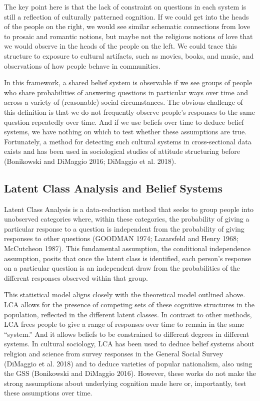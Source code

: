 \documentclass[12pt,]{article}
\begin{document}
The key point here is that the lack of constraint on questions in each system is still a reflection of culturally patterned cognition. If we could get into the heads of the people on the right, we would see similar schematic connections from love to prosaic and romantic notions, but maybe not the religious notions of love that we would observe in the heads of the people on the left. We could trace this structure to exposure to cultural artifacts, such as movies, books, and music, and observations of how people behave in communities.

In this framework, a shared belief system is observable if we see groups of people who share probabilities of answering questions in particular ways over time and across a variety of (reasonable) social circumstances. The obvious challenge of this definition is that we do not frequently observe people's responses to the same question repeatedly over time. And if we use beliefs over time to deduce belief systems, we have nothing on which to test whether these assumptions are true. Fortunately, a method for detecting such cultural systems in cross-sectional data exists and has been used in sociological studies of attitude structuring before (Bonikowski and DiMaggio 2016; DiMaggio et al. 2018).

\hypertarget{latent-class-analysis-and-belief-systems}{%
\subsection{Latent Class Analysis and Belief Systems}\label{latent-class-analysis-and-belief-systems}}

Latent Class Analysis is a data-reduction method that seeks to group people into unobserved categories where, within these categories, the probability of giving a particular response to a question is independent from the probability of giving responses to other questions (GOODMAN 1974; Lazarsfeld and Henry 1968; McCutcheon 1987). This fundamental assumption, the conditional independence assumption, posits that once the latent class is identified, each person's response on a particular question is an independent draw from the probabilities of the different responses observed within that group.

This statistical model aligns closely with the theoretical model outlined above. LCA allows for the presence of competing sets of these cognitive structures in the population, reflected in the different latent classes. In contrast to other methods, LCA frees people to give a range of responses over time to remain in the same ``system.'' And it allows beliefs to be constrained to different degrees in different systems. In cultural sociology, LCA has been used to deduce belief systems about religion and science from survey responses in the General Social Survey (DiMaggio et al. 2018) and to deduce varieties of popular nationalism, also using the GSS (Bonikowski and DiMaggio 2016). However, these works do not make the strong assumptions about underlying cognition made here or, importantly, test these assumptions over time.
\end{document}
